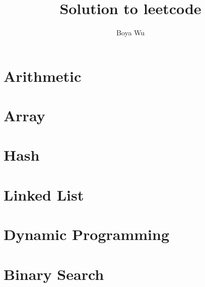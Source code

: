 \documentclass[oneside]{book}
\begin{document}
\begin{CJK}{UTF8}{gbsn}     %

\renewcommand{\contentsname}{目录}
\renewcommand{\figurename}{图}
\renewcommand{\tablename}{表}

\renewcommand{\cftchapfont}{\bfseries}
\renewcommand{\cftchappagefont}{\bfseries}
\renewcommand{\cftchappresnum}{第}
\renewcommand{\cftchapaftersnum}{章:}
\renewcommand{\cftchapnumwidth}{4em}      %

\pagestyle{fancy}
\renewcommand{\chaptermark}[1]{\markboth{\small 第\,\thechapter\,章\quad #1}{}}
\renewcommand{\sectionmark}[1]{\markright{\small\thesection\quad #1}{}}
\fancyhf{}
\fancyhead[ER]{\leftmark}
\fancyhead[OL]{\rightmark}
\fancyhead[EL,OR]{$\cdot$\ \thepage\ $\cdot$}
\renewcommand{\headrulewidth}{0.4pt}

\title{Solution to leetcode}
\author{Boya Wu}
\date{}

\maketitle

\tableofcontents

\chapter{Arithmetic}


\chapter{Array}


\chapter{Hash}


\chapter{Linked List}


\chapter{Dynamic Programming}


\chapter{Binary Search}



\end{CJK}
\end{document}
